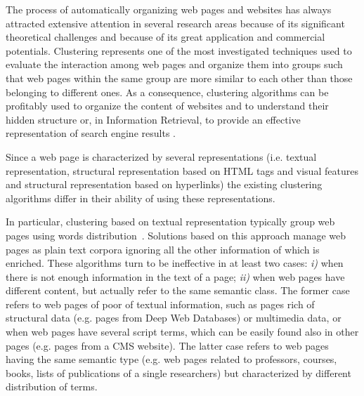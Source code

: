 

The process of automatically organizing web pages and websites has always attracted extensive attention in several research areas because of its significant theoretical challenges and because of its great application and commercial potentials.
Clustering represents one of the most investigated techniques used to evaluate the interaction among web pages and organize them into groups such that web pages within the same group are more similar to each other than those belonging to different ones. As a consequence, clustering algorithms can be profitably used to organize the 
content of websites and to understand their hidden structure or, in Information Retrieval, to provide an effective representation of search engine results \cite{Zamir:1998}. 

Since a web page is characterized by several representations (i.e. textual representation,  structural representation based on HTML tags and visual features and structural representation based on hyperlinks) the existing clustering algorithms differ in their ability of using these representations.  


In particular, clustering based on textual representation typically group web pages using words distribution~\cite{Chehreghani:2008, Haveliwala:2002, Zamir:1998}. 
Solutions based on this approach manage web pages as plain text corpora ignoring all the other information of which is enriched.
These algorithms turn to be ineffective in at least two cases: \emph{i)} when there is not enough information in the text of a page; \emph{ii)} when web pages have different content, but actually refer to the same semantic class.
The former case refers to web pages of poor of textual information, such as pages rich of structural data (e.g. pages from Deep Web Databases) or multimedia data, or when web pages have several script terms, which can be easily found also in other pages (e.g. pages from a CMS website). The latter case refers to web pages having the same semantic type (e.g. web pages related to professors, courses, books, lists of publications of a single researchers) but characterized by different distribution of terms. 


